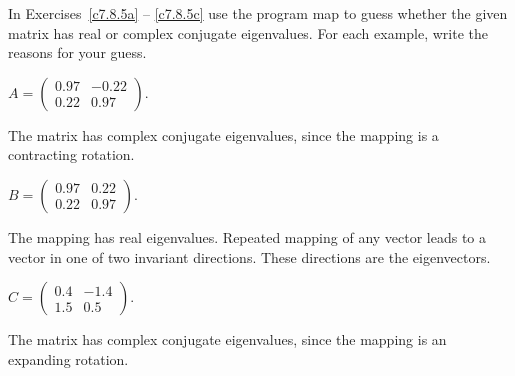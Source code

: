 \documentclass{ximera}
\begin{document}
\noindent In Exercises~\ref{c7.8.5a} -- \ref{c7.8.5c} use the program
{\sf map} to guess whether the given matrix has real or complex conjugate
eigenvalues.  For each example, write the reasons for your guess.
\begin{computerExercise} \label{c7.8.5a}
$A=\left(\begin{array}{rr} 0.97 & -0.22\\ 0.22 & 0.97
\end{array}\right)$.

\begin{solution}
The matrix has complex conjugate eigenvalues, since the
mapping is a contracting rotation.

\end{solution}
\end{computerExercise}
\begin{computerExercise} \label{c7.8.5b}
$B=\left(\begin{array}{rr} 0.97 & 0.22\\ 0.22 & 0.97
\end{array}\right)$.

\begin{solution}
The mapping has real eigenvalues.  Repeated mapping of any
vector leads to a vector in one of two invariant directions.  These
directions are the eigenvectors.

\end{solution}
\end{computerExercise}
\begin{computerExercise} \label{c7.8.5c}
$C=\left(\begin{array}{rr} 0.4 & -1.4\\ 1.5 & 0.5
\end{array}\right)$.

\begin{solution}
The matrix has complex conjugate eigenvalues, since the
mapping is an expanding rotation.

\end{solution}
\end{computerExercise}
\end{document}

